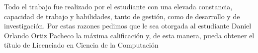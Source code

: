 \begin{opinion}
    Todo el trabajo fue realizado por el estudiante con una elevada constancia, capacidad de 
    trabajo y habilidades, tanto de gestión, como de desarrollo y de investigación.
    Por estas razones pedimos que le sea otorgada al estudiante Daniel Orlando Ortiz Pacheco 
    la máxima calificación y, de esta manera, pueda obtener el título de Licenciado 
    en Ciencia de la Computación
    
    
    

\begingroup
  \centering
  \hspace{1cm}
  \par
\endgroup

\end{opinion}

